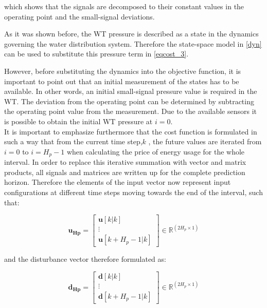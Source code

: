 which shows that the signals are decomposed to their constant values in the operating point and the small-signal deviations. 

As it was shown before, the WT pressure is described as a state in the dynamics governing the water distribution system. Therefore the state-space model in \eqref{dyn} can be used to substitute this pressure term in \eqref{eqcost_3}.

However, before substituting the dynamics into the objective function, it is important to point out that an initial measurement of the states has to be available. In other words, an initial small-signal pressure value is required in the WT. The deviation from the operating point can be determined by subtracting the operating point value from the measurement. 
Due to the available sensors it is possible to obtain the initial WT pressure at $i = 0$. 
\\
\newline
It is important to emphasize furthermore that the cost function is formulated in such a way that from the current time step,$k$ , the future values are iterated from $i = 0$ to $i = H_p - 1$ when calculating the price of energy usage for the whole interval. In order to replace this iterative summation with vector and matrix products, all signals and matrices are written up for the complete prediction horizon. Therefore the elements of the input vector now represent input configurations at different time steps moving towards the end of the interval, such that:

\begin{equation}
\bm{u_{Hp}} =  
 \begin{bmatrix}
  \bm{u}[k|k]\\
  \vdots  \\
  \bm{u}[k+H_p-1|k]   
 \end{bmatrix}
 \in \pmb{\mathbb{R}}^{(2 H_p \times 1)}
 \label{eq:uhp}
\end{equation}

and the disturbance vector therefore formulated as:

\begin{equation}
\bm{d_{Hp}} =  
 \begin{bmatrix}
  \bm{d}[k|k]\\
  \vdots  \\
  \bm{d}[k+H_p-1|k]   
 \end{bmatrix}
 \in \pmb{\mathbb{R}}^{(2 H_p \times 1)}
 \label{eq:dhp}
\end{equation}


